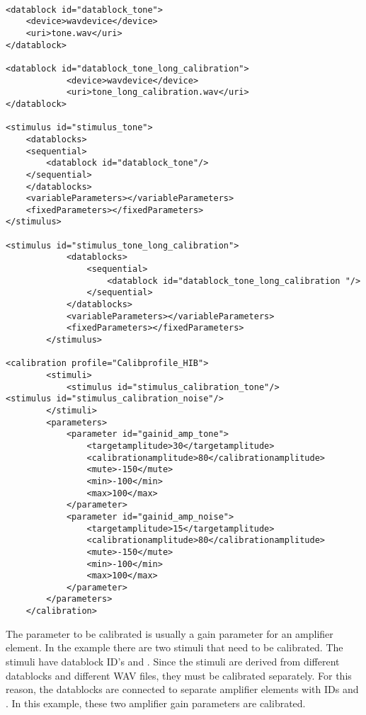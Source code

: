 \begin{lstlisting}

<datablock id="datablock_tone">
	<device>wavdevice</device>
	<uri>tone.wav</uri>
</datablock>

<datablock id="datablock_tone_long_calibration">
            <device>wavdevice</device>
            <uri>tone_long_calibration.wav</uri>
</datablock>

<stimulus id="stimulus_tone">
	<datablocks>
	<sequential>
		<datablock id="datablock_tone"/>
	</sequential>
	</datablocks>
	<variableParameters></variableParameters>
	<fixedParameters></fixedParameters>
</stimulus>

<stimulus id="stimulus_tone_long_calibration">
            <datablocks>
                <sequential>
                    <datablock id="datablock_tone_long_calibration "/>
                </sequential>
            </datablocks>
            <variableParameters></variableParameters>
            <fixedParameters></fixedParameters>
        </stimulus>

<calibration profile="Calibprofile_HIB">
        <stimuli>
            <stimulus id="stimulus_calibration_tone"/>
<stimulus id="stimulus_calibration_noise"/>
        </stimuli>
        <parameters>
            <parameter id="gainid_amp_tone">
                <targetamplitude>30</targetamplitude>
                <calibrationamplitude>80</calibrationamplitude>
                <mute>-150</mute>
                <min>-100</min>
                <max>100</max>
            </parameter>
            <parameter id="gainid_amp_noise">
                <targetamplitude>15</targetamplitude>
                <calibrationamplitude>80</calibrationamplitude>
                <mute>-150</mute>
                <min>-100</min>
                <max>100</max>
            </parameter>
        </parameters>
    </calibration>

\end{lstlisting}

The parameter to be calibrated is usually a gain parameter for an amplifier element. In the example there are two stimuli that need to be calibrated. The stimuli have datablock ID’s  and . Since the stimuli are derived from different datablocks and different WAV files, they must be calibrated separately. For this reason, the datablocks are connected to separate amplifier elements with IDs  and . In this example, these two amplifier gain parameters are calibrated.

